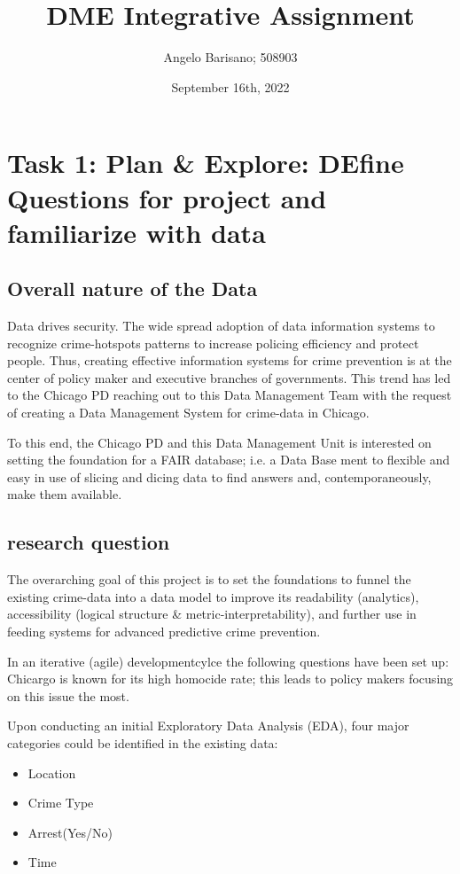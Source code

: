 \documentclass[a4paper]{article}
\begin{document}
\title{DME Integrative Assignment}
\author{Angelo Barisano; 508903 }
\date{September 16th, 2022}
\maketitle

\newpage
\section{Task 1: Plan \& Explore: DEfine Questions for project and familiarize with data}

\subsection{Overall nature of the Data}
Data drives security. The wide spread adoption of data information systems to recognize crime-hotspots patterns to increase policing efficiency and protect people. Thus, creating effective information systems for crime prevention is at the center of policy maker and executive branches of governments. This trend has led to the Chicago PD reaching out to this Data Management Team with the request of creating a Data Management System for crime-data in Chicago.

To this end, the Chicago PD and this Data Management Unit is interested on setting the foundation for a FAIR database; i.e. a Data Base ment to flexible and easy in use of slicing and dicing data to find answers and, contemporaneously, make them available. 

\subsection{research question}
The overarching goal of this project is to set the foundations to funnel the existing crime-data into a data model to improve its readability (analytics), accessibility (logical structure \& metric-interpretability), and further use in feeding systems for advanced predictive crime prevention. 


In an iterative (agile) developmentcylce the following questions have been set up: Chicargo is known for its high homocide rate; this leads to policy makers focusing on this issue the most. 

Upon conducting an initial Exploratory Data Analysis (EDA),  four major categories could be identified in the existing data: 

\begin{itemize}
  \item Location
  \item Crime Type
  \item Arrest(Yes/No)
  \item Time 
\end{itemize}
\end{document}
